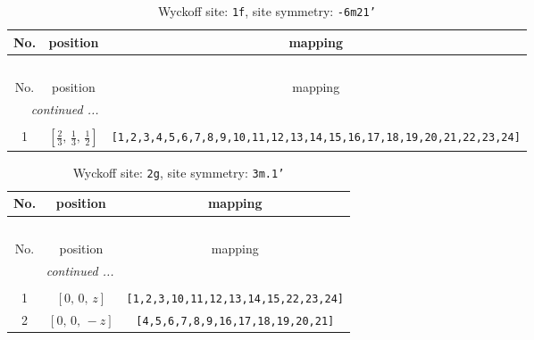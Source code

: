 \documentclass[fleqn,8pt]{jsarticle}
\begin{document}
\renewcommand{\arraystretch}{1.2}
\begin{longtable}{ccc}
\caption{Wyckoff site: {\tt 1f}, site symmetry: {\tt -6m21'}}
 \\
 \hline \hline
No. & position & mapping \\ \hline \endfirsthead

\multicolumn{2}{l}{\tablename\ \thetable{}} \\
 \hline \hline
No. & position & mapping \\ \hline \endhead

 \hline \hline
\multicolumn{2}{r}{\footnotesize\it continued ...} \\ \endfoot

 \hline \hline
\multicolumn{2}{r}{} \\ \endlastfoot

1 & $\left[ \frac{2}{3},\, \frac{1}{3},\, \frac{1}{2} \right]$ & {\tt [1,2,3,4,5,6,7,8,9,10,11,12,13,14,15,16,17,18,19,20,21,22,23,24]} \\
\end{longtable}
\renewcommand{\arraystretch}{1.2}
\begin{longtable}{ccc}
\caption{Wyckoff site: {\tt 2g}, site symmetry: {\tt 3m.1'}}
 \\
 \hline \hline
No. & position & mapping \\ \hline \endfirsthead

\multicolumn{2}{l}{\tablename\ \thetable{}} \\
 \hline \hline
No. & position & mapping \\ \hline \endhead

 \hline \hline
\multicolumn{2}{r}{\footnotesize\it continued ...} \\ \endfoot

 \hline \hline
\multicolumn{2}{r}{} \\ \endlastfoot

1 & $\left[ 0,\, 0,\, z \right]$ & {\tt [1,2,3,10,11,12,13,14,15,22,23,24]} \\ \hline
2 & $\left[ 0,\, 0,\, - z \right]$ & {\tt [4,5,6,7,8,9,16,17,18,19,20,21]} \\
\end{longtable}
\renewcommand{\arraystretch}{1.2}
\end{document}
